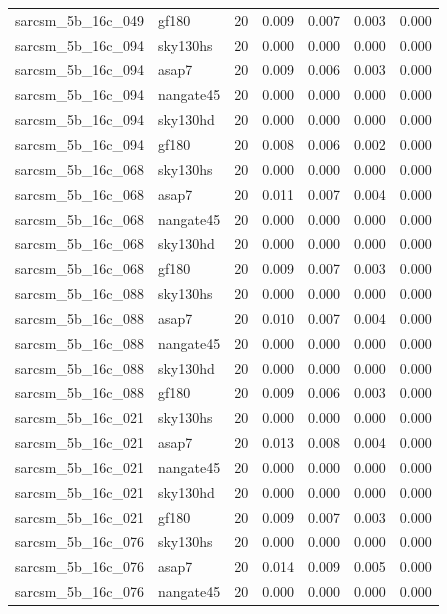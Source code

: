 \begin{tabular}{llrrrrr}
sarcsm\_5b\_16c\_049 & gf180 & 20 & 0.009 & 0.007 & 0.003 & 0.000 \\
sarcsm\_5b\_16c\_094 & sky130hs & 20 & 0.000 & 0.000 & 0.000 & 0.000 \\
sarcsm\_5b\_16c\_094 & asap7 & 20 & 0.009 & 0.006 & 0.003 & 0.000 \\
sarcsm\_5b\_16c\_094 & nangate45 & 20 & 0.000 & 0.000 & 0.000 & 0.000 \\
sarcsm\_5b\_16c\_094 & sky130hd & 20 & 0.000 & 0.000 & 0.000 & 0.000 \\
sarcsm\_5b\_16c\_094 & gf180 & 20 & 0.008 & 0.006 & 0.002 & 0.000 \\
sarcsm\_5b\_16c\_068 & sky130hs & 20 & 0.000 & 0.000 & 0.000 & 0.000 \\
sarcsm\_5b\_16c\_068 & asap7 & 20 & 0.011 & 0.007 & 0.004 & 0.000 \\
sarcsm\_5b\_16c\_068 & nangate45 & 20 & 0.000 & 0.000 & 0.000 & 0.000 \\
sarcsm\_5b\_16c\_068 & sky130hd & 20 & 0.000 & 0.000 & 0.000 & 0.000 \\
sarcsm\_5b\_16c\_068 & gf180 & 20 & 0.009 & 0.007 & 0.003 & 0.000 \\
sarcsm\_5b\_16c\_088 & sky130hs & 20 & 0.000 & 0.000 & 0.000 & 0.000 \\
sarcsm\_5b\_16c\_088 & asap7 & 20 & 0.010 & 0.007 & 0.004 & 0.000 \\
sarcsm\_5b\_16c\_088 & nangate45 & 20 & 0.000 & 0.000 & 0.000 & 0.000 \\
sarcsm\_5b\_16c\_088 & sky130hd & 20 & 0.000 & 0.000 & 0.000 & 0.000 \\
sarcsm\_5b\_16c\_088 & gf180 & 20 & 0.009 & 0.006 & 0.003 & 0.000 \\
sarcsm\_5b\_16c\_021 & sky130hs & 20 & 0.000 & 0.000 & 0.000 & 0.000 \\
sarcsm\_5b\_16c\_021 & asap7 & 20 & 0.013 & 0.008 & 0.004 & 0.000 \\
sarcsm\_5b\_16c\_021 & nangate45 & 20 & 0.000 & 0.000 & 0.000 & 0.000 \\
sarcsm\_5b\_16c\_021 & sky130hd & 20 & 0.000 & 0.000 & 0.000 & 0.000 \\
sarcsm\_5b\_16c\_021 & gf180 & 20 & 0.009 & 0.007 & 0.003 & 0.000 \\
sarcsm\_5b\_16c\_076 & sky130hs & 20 & 0.000 & 0.000 & 0.000 & 0.000 \\
sarcsm\_5b\_16c\_076 & asap7 & 20 & 0.014 & 0.009 & 0.005 & 0.000 \\
sarcsm\_5b\_16c\_076 & nangate45 & 20 & 0.000 & 0.000 & 0.000 & 0.000 \\

\end{tabular}
